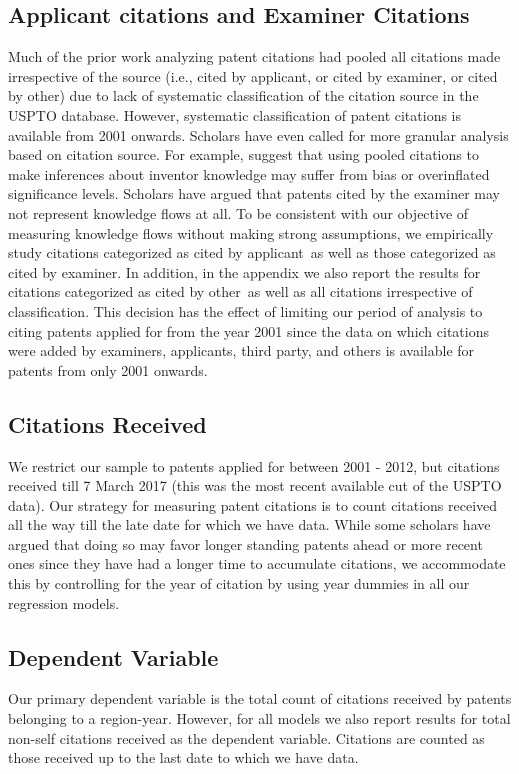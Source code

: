 \documentclass[12pt,letterpaper]{article}
\begin{document}
\subsection{Applicant citations and Examiner Citations}
Much of the prior work analyzing patent citations had pooled all citations made irrespective of the source (i.e., cited by applicant, or cited by examiner, or cited by other) due to lack of systematic classification of the citation source in the USPTO database. However, systematic classification of patent citations is available from 2001 onwards. Scholars have even called for more granular analysis based on citation source. For example, \cite{Alcacer2006a} suggest that using pooled citations to make inferences about inventor knowledge may suffer from bias or overinflated significance levels. Scholars have argued that patents cited by the examiner may not represent knowledge flows at all. To be consistent with our objective of measuring knowledge flows without making strong assumptions, we empirically study citations categorized as \textquotesingle cited by applicant\textquotesingle \ as well as those categorized as \textquotesingle cited by examiner\textquotesingle. In addition, in the appendix we also report the results for citations categorized as \textquotesingle cited by other\textquotesingle \ as well as all citations irrespective of classification. This decision has the  effect of limiting our period of analysis to citing patents applied for from the year 2001 since the data on which citations were added by examiners, applicants, third party, and others is available for patents from only 2001 onwards. 

\subsection{Citations Received}
We restrict our sample to patents applied for between 2001 - 2012, but citations received till 7 March 2017 (this was the most recent available cut of the USPTO data). Our strategy for measuring patent citations is to count citations received all the way till the late date for which we have data. While some scholars have argued that doing so may favor longer standing patents ahead or more recent ones since they have had a longer time to accumulate citations, we accommodate this by controlling for the year of citation by using year dummies in all our regression models. \par

\subsection{Dependent Variable}
Our primary dependent variable is the  total count of citations received by patents belonging to a region-year. However, for all models we also report results for total non-self citations received as the dependent variable. Citations are counted as those received up to the last date to which we have data. 
\end{document}
